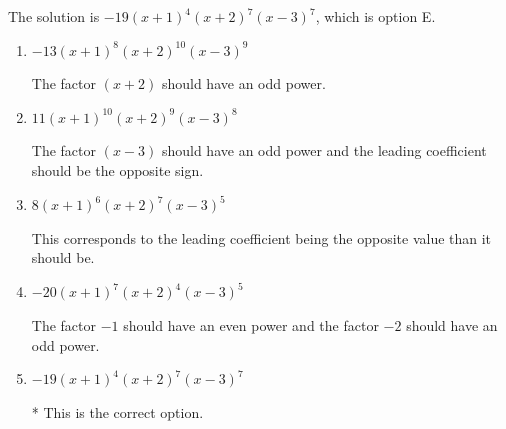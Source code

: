 \documentclass{extbook}[14pt]
\begin{document}
\begin{enumerate}
{The solution is \( -19(x + 1)^{4} (x + 2)^{7} (x - 3)^{7} \), which is option E.\begin{enumerate}[label=\Alph*.]
\item \( -13(x + 1)^{8} (x + 2)^{10} (x - 3)^{9} \)

The factor $(x + 2)$ should have an odd power.
\item \( 11(x + 1)^{10} (x + 2)^{9} (x - 3)^{8} \)

The factor $(x - 3)$ should have an odd power and the leading coefficient should be the opposite sign.
\item \( 8(x + 1)^{6} (x + 2)^{7} (x - 3)^{5} \)

This corresponds to the leading coefficient being the opposite value than it should be.
\item \( -20(x + 1)^{7} (x + 2)^{4} (x - 3)^{5} \)

The factor $-1$ should have an even power and the factor $-2$ should have an odd power.
\item \( -19(x + 1)^{4} (x + 2)^{7} (x - 3)^{7} \)

* This is the correct option.
\end{enumerate}

}
\end{enumerate}
\end{document}
